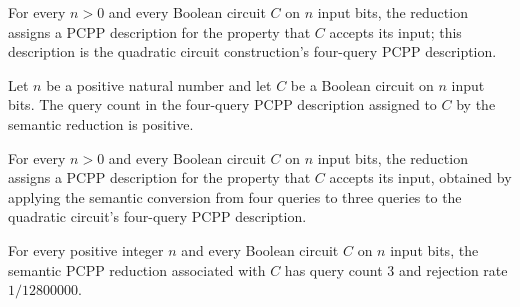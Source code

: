 \begin{definition}
\label{FABL.circuitQuadraticFourQuerySemanticPCPPReduction}
\leanok
{}
For every $n>0$ and every Boolean circuit $C$ on $n$ input bits, the reduction assigns a
PCPP description for the property that $C$ accepts its input; this description is the
quadratic circuit construction's four-query PCPP description.
\end{definition}

\begin{theorem}
\label{FABL.circuitQuadraticFourQuerySemanticPCPPReduction_queryCount_pos}
\leanok
{}
Let $n$ be a positive natural number and let $C$ be a Boolean circuit on $n$ input bits.
The query count in the four-query PCPP description assigned to $C$ by the semantic
reduction is positive.
\end{theorem}

\begin{definition}
\label{FABL.quadraticCircuitSemanticPCPPReduction}
\leanok
{}
For every $n>0$ and every Boolean circuit $C$ on $n$ input bits, the reduction assigns a
PCPP description for the property that $C$ accepts its input, obtained by applying the
semantic conversion from four queries to three queries to the quadratic circuit's
four-query PCPP description.
\end{definition}

\begin{theorem}
\label{FABL.quadraticCircuitSemanticPCPPReduction_resources}
\leanok
{}
For every positive integer $n$ and every Boolean circuit $C$ on $n$ input bits, the
semantic PCPP reduction associated with $C$ has query count $3$ and rejection rate
$1/12800000$.
\end{theorem}

